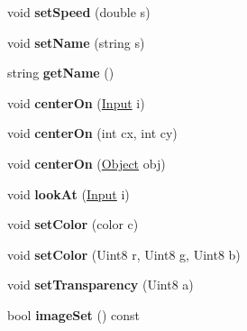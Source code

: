 \begin{DoxyCompactItemize}
\item 
void {\bfseries set\+Speed} (double s)\hypertarget{classObject_aa9852a2d118039aa87c39428be9dc5ee}{}\label{classObject_aa9852a2d118039aa87c39428be9dc5ee}

\item 
void {\bfseries set\+Name} (string s)\hypertarget{classObject_a710f0d5a657ae488408e1191bfccbddb}{}\label{classObject_a710f0d5a657ae488408e1191bfccbddb}

\item 
string {\bfseries get\+Name} ()\hypertarget{classObject_ac63fc97e60a9b5772afd9adefc337928}{}\label{classObject_ac63fc97e60a9b5772afd9adefc337928}

\item 
void {\bfseries center\+On} (\hyperlink{classInput}{Input} i)\hypertarget{classObject_a3f0dd556a0bc28cdc3ac99f8dbc5e9a9}{}\label{classObject_a3f0dd556a0bc28cdc3ac99f8dbc5e9a9}

\item 
void {\bfseries center\+On} (int cx, int cy)\hypertarget{classObject_a32c6b207bc3f04afda88d1b483b5cc93}{}\label{classObject_a32c6b207bc3f04afda88d1b483b5cc93}

\item 
void {\bfseries center\+On} (\hyperlink{classObject}{Object} obj)\hypertarget{classObject_af04a43818df93d6cbd87cfba97f56fb7}{}\label{classObject_af04a43818df93d6cbd87cfba97f56fb7}

\item 
void {\bfseries look\+At} (\hyperlink{classInput}{Input} i)\hypertarget{classObject_a69d8fd2bd6ea43fecd7b15cf1aae067f}{}\label{classObject_a69d8fd2bd6ea43fecd7b15cf1aae067f}

\item 
void {\bfseries set\+Color} (color c)\hypertarget{classObject_a63ba630f4c0329b53bf92418fda14c28}{}\label{classObject_a63ba630f4c0329b53bf92418fda14c28}

\item 
void {\bfseries set\+Color} (Uint8 r, Uint8 g, Uint8 b)\hypertarget{classObject_a3edcc3118a41df3a46a096b23823f37e}{}\label{classObject_a3edcc3118a41df3a46a096b23823f37e}

\item 
void {\bfseries set\+Transparency} (Uint8 a)\hypertarget{classObject_aa07a7c992ab59f6c1ee929e03fa2c2ea}{}\label{classObject_aa07a7c992ab59f6c1ee929e03fa2c2ea}

\item 
bool {\bfseries image\+Set} () const \hypertarget{classObject_a5adfc058772a1306d7edbd4e68e77533}{}\label{classObject_a5adfc058772a1306d7edbd4e68e77533}


\end{DoxyCompactItemize}
